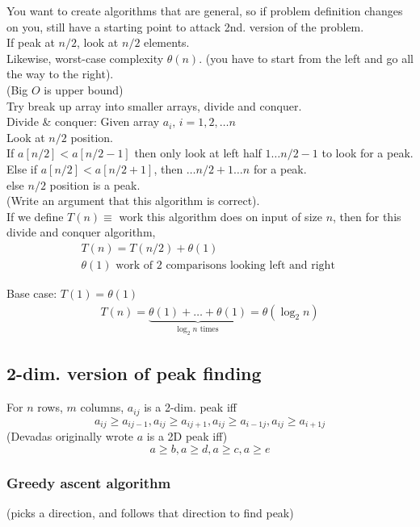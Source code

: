 \documentclass[10pt]{amsart}
\begin{document}
\begin{multicols*}{2}
You want to create algorithms that are general, so if problem definition changes on you, still have a starting point to attack 2nd. version of the problem.\\

If peak at $n/2$, look at $n/2$ elements. \\
Likewise, worst-case complexity $\theta(n)$. (you have to start from the left and go all the way to the right). \\
(Big $O$ is upper bound) \\

Try break up array into smaller arrays, divide and conquer. \\
Divide \& conquer: Given array $a_i, \, i = 1, 2, \dots n$ \\
Look at $n/2$ position. \\
If $a[n/2] < a[n/2 - 1]$ then only look at left half $1\dots n/2 - 1$ to look for a peak. \\
Else if $a[n/2] < a[n/2 + 1]$, then $\dots n/2 + 1 \dots n$ for a peak. \\
else $n/2$ position is a peak. \\
(Write an argument that this algorithm is correct). \\

If we define $T(n) \equiv$ work this algorithm does on input of size $n$, then for this divide and conquer algorithm, 
\[
\begin{gathered}
T(n) = T(n/2) + \theta(1) \\
\theta(1) \text{ work of 2 comparisons looking left and right }
\end{gathered}
\]

Base case: $T(1) = \theta(1)$
\[
\begin{gathered}
T(n) = \underbrace{\theta(1) + \dots + \theta(1)}_{\log_2{n} \text{ times } } = \theta(\log_2{n})
\end{gathered}
\]

\subsection{2-dim. version of peak finding}

For $n$ rows, $m$ columns, $a_{ij}$ is a 2-dim. peak iff 
\[
a_{ij} \geq a_{ij-1}, a_{ij} \geq a_{ij+1}, a_{ij} \geq a_{i-1j}, a_{ij} \geq a_{i+1j}
\]
(Devadas originally wrote $a$ is a 2D peak iff)
\[
a \geq b, a \geq d, a\geq c, a\geq e
\]


\subsubsection{Greedy ascent algorithm} (picks a direction, and follows that direction to find peak)


\end{multicols*}
\end{document}
